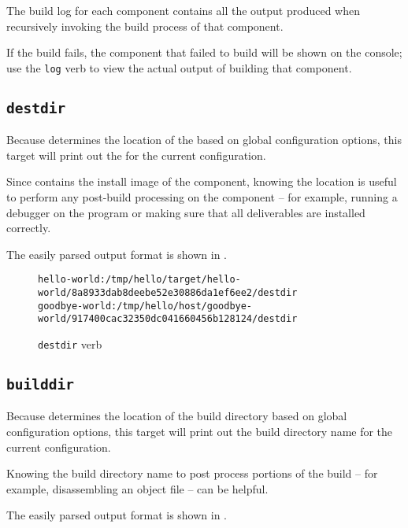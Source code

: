 The build log for each component contains all the output produced when
recursively invoking the build process of that component.

If the build fails, the component that failed to build will be shown
on the console; use the \texttt{log} verb to view the actual output of
building that component.

\subsection{\texttt{destdir}}\label{usinglmsbw:destdir}

Because \lmsbw determines the location of the \destdir based on global
configuration options, this target will print out the \destdir for the
current configuration.

Since \destdir contains the install image of the component, knowing
the \destdir location is useful to perform any post-build processing
on the component -- for example, running a debugger on the program or
making sure that all deliverables are installed correctly.

The easily parsed output format is shown in
.

\begin{figure}[tbh]
\hrulefill
\begin{scriptsize}
\begin{verbatim}
hello-world:/tmp/hello/target/hello-world/8a8933dab8deebe52e30886da1ef6ee2/destdir
goodbye-world:/tmp/hello/host/goodbye-world/917400cac32350dc041660456b128124/destdir
\end{verbatim}
\end{scriptsize}
\hrulefill
\caption{\texttt{destdir} verb}\label{usinglmsbw:destdir-verb}
\end{figure}

\subsection{\texttt{builddir}}\label{usinglmsbw:builddir}

Because \lmsbw determines the location of the build directory based on
global configuration options, this target will print out the build
directory name for the current configuration.

Knowing the build directory name to post process portions of the build
-- for example, disassembling an object file -- can be helpful.

The easily parsed output format is shown in
.

